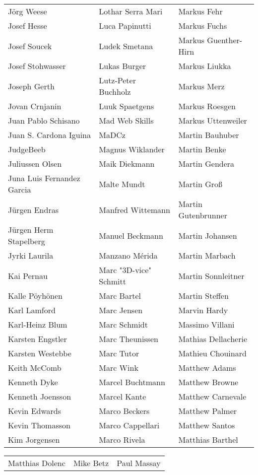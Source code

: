 \begin{small}
\begin{tabular}{p{4cm}p{4cm}p{4cm}}
Jörg Weese & Lothar Serra Mari & Markus Fehr \\
Josef Hesse & Luca Papinutti & Markus Fuchs \\
Josef Soucek & Ludek Smetana & Markus Guenther-Hirn \\
Josef Stohwasser & Lukas Burger & Markus Liukka \\
Joseph Gerth & Lutz-Peter Buchholz & Markus Merz \\
Jovan Crnjanin & Luuk Spaetgens & Markus Roesgen \\
Juan Pablo Schisano & Mad Web Skills & Markus Uttenweiler \\
Juan S. Cardona Iguina & MaDCz & Martin Bauhuber \\
JudgeBeeb & Magnus Wiklander & Martin Benke \\
Juliussen Olsen & Maik Diekmann & Martin Gendera \\
Juna Luis Fernandez Garcia & Malte Mundt & Martin Groß \\
Jürgen Endras & Manfred Wittemann & Martin Gutenbrunner \\
Jürgen Herm Stapelberg & Manuel Beckmann & Martin Johansen \\
Jyrki Laurila & Manzano Mérida & Martin Marbach \\
Kai Pernau & Marc "3D-vice" Schmitt & Martin Sonnleitner \\
Kalle Pöyhönen & Marc Bartel & Martin Steffen \\
Karl Lamford & Marc Jensen & Marvin Hardy \\
Karl-Heinz Blum & Marc Schmidt & Massimo Villani \\
Karsten Engstler & Marc Theunissen & Mathias Dellacherie \\
Karsten Westebbe & Marc Tutor & Mathieu Chouinard \\
Keith McComb & Marc Wink & Matthew Adams \\
Kenneth Dyke & Marcel Buchtmann & Matthew Browne \\
Kenneth Joensson & Marcel Kante & Matthew Carnevale \\
Kevin Edwards & Marco Beckers & Matthew Palmer \\
Kevin Thomasson & Marco Cappellari & Matthew Santos \\
Kim Jorgensen & Marco Rivela & Matthias Barthel \\
\end{tabular}
\newpage
\setlength{\tabcolsep}{1mm}
\begin{tabular}{p{4cm}p{4cm}p{4cm}}
Matthias Dolenc & Mike Betz & Paul Massay \\

\end{tabular}
\end{small}
